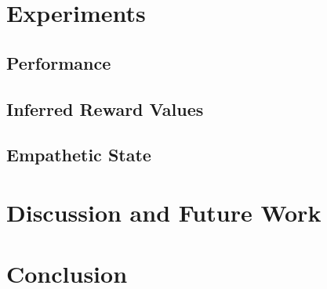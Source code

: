 \documentclass[runningheads,table]{llncs}
\begin{document}
\section{Experiments}


\subsection{Performance}
%
\label{sec:performance}

\subsection{Inferred Reward Values}


\subsection{Empathetic State}
\label{sec:emp_state}

\section{Discussion and Future Work}


\section{Conclusion}



%
%
%


\end{document}
